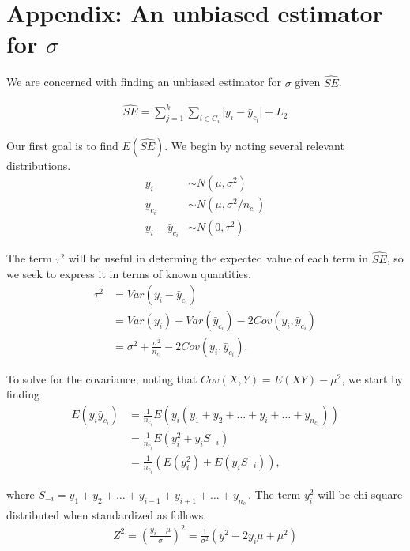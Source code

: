 \section{Appendix: An unbiased estimator for $\sigma$}
\label{Sec:AppSig}

We are concerned with finding an unbiased estimator for $\sigma$ given $\widehat{SE}$.

\begin{align}
\widehat{SE} = \sum_{j=1}^k \sum_{i \in C_i} \lvert y_i - \bar{y}_{c_i} \rvert + L_2 \label{eq:se}
\end{align}

Our first goal is to find $E(\widehat{SE})$. We begin by noting several relevant distributions.
\begin{align*}
y_i &\sim N(\mu, \sigma^2) \\
\bar{y}_{c_i} &\sim N(\mu, \sigma^2/n_{c_i}) \\
y_i - \bar{y}_{c_i} &\sim N(0, \tau^2).
\end{align*}

The term $\tau^2$ will be useful in determing the expected value of each term in $\widehat{SE}$, so we seek to express it in terms of known quantities.
\begin{align}
\tau^2 &= Var(y_i - \bar{y}_{c_i}) \nonumber \\
&= Var(y_i) + Var(\bar{y}_{c_i}) - 2 Cov(y_i, \bar{y}_{c_i}) \nonumber \\
&= \sigma^2 + \frac{\sigma^2}{n_{c_i}} - 2 Cov(y_i, \bar{y}_{c_i}). \label{eq:tau}
\end{align}

To solve for the covariance, noting that $Cov(X,Y) = E(XY) - \mu^2$, we start by finding
\begin{align}
E(y_i \bar{y}_{c_i}) &= \frac{1}{n_{c_i}} E(y_i (y_1 + y_2 + \ldots + y_i + \ldots + y_{n_{c_1}})) \nonumber \\
&= \frac{1}{n_{c_i}} E(y_i^2 + y_i S_{-i}) \nonumber \\
&= \frac{1}{n_{c_i}}\left( E\left(y_i^2\right) + E\left(y_i S_{-i}\right)\right), \label{eq:eyy}
\end{align}

where $S_{-i} = y_1 + y_2 + \ldots + y_{i-1} + y_{i+1} + \ldots + y_{n_{c_i}}$. The term $y_i^2$ will be chi-square distributed when standardized as follows.
\begin{align*}
Z^2 = \left(\frac{y_i - \mu}{\sigma}\right)^2 = \frac{1}{\sigma^2}\left(y^2 - 2y_i\mu + \mu^2\right)
\end{align*}

